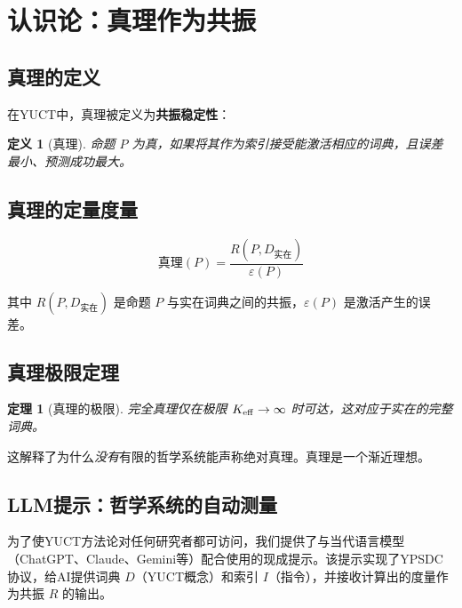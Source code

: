\documentclass[11pt,a4paper]{article}
\newtheorem{theorem}{定理}[section]
\newtheorem{definition}{定义}[section]
\newcommand{\eps}{\varepsilon}
\begin{document}
	
	\section{认识论：真理作为共振}
	
	\subsection{真理的定义}
	
	在YUCT中，真理被定义为\textbf{共振稳定性}：
	
	\begin{definition}[真理]
		命题 \(P\) 为真，如果将其作为索引接受能激活相应的词典，且误差最小、预测成功最大。
	\end{definition}
	
	\subsection{真理的定量度量}
	
	\begin{equation}
		\text{真理}(P) = \frac{R(P, D_{\text{实在}})}{\eps(P)}
	\end{equation}
	
	其中 \(R(P, D_{\text{实在}})\) 是命题 \(P\) 与实在词典之间的共振，\(\eps(P)\) 是激活产生的误差。
	
	\subsection{真理极限定理}
	
	\begin{theorem}[真理的极限]
		完全真理仅在极限 \(\Keff \to \infty\) 时可达，这对应于实在的完整词典。
	\end{theorem}
	
	这解释了为什么\emph{没有}有限的哲学系统能声称绝对真理。真理是一个渐近理想。
	
	\subsection{LLM提示：哲学系统的自动测量}
	\label{sec:llm-prompt}
	
	为了使YUCT方法论对任何研究者都可访问，我们提供了与当代语言模型（ChatGPT、Claude、Gemini等）配合使用的现成提示。该提示实现了YPSDC协议，给AI提供词典 \(D\)（YUCT概念）和索引 \(I\)（指令），并接收计算出的度量作为共振 \(R\) 的输出。
	
\end{document}
